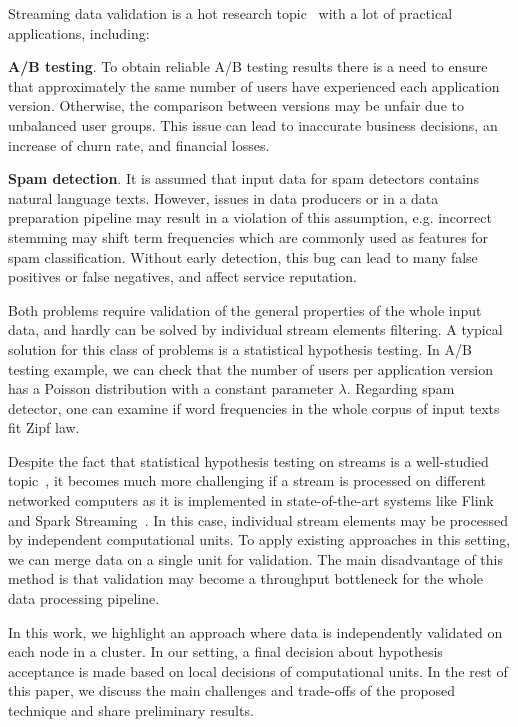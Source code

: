 \label {fs-short-intro}

Streaming data validation is a hot research topic~\cite{Xu:2013:MVS:2488222.2488275, frank2018semantic} with a lot of practical applications, including:

{\bf A/B testing}. To obtain reliable A/B testing results there is a need to ensure that approximately the same number of users have experienced each application version. Otherwise, the comparison between versions may be unfair due to unbalanced user groups. This issue can lead to inaccurate business decisions, an increase of churn rate, and financial losses.
    
{\bf Spam detection}. It is assumed that input data for spam detectors contains natural language texts. However, issues in data producers or in a data preparation pipeline may result in a violation of this assumption, e.g. incorrect stemming may shift term frequencies which are commonly used as features for spam classification. Without early detection, this bug can lead to many false positives or false negatives, and affect service reputation.

Both problems require validation of the general properties of the whole input data, and hardly can be solved by individual stream elements filtering. A typical solution for this class of problems is a statistical hypothesis testing. In A/B testing example, we can check that the number of users per application version has a Poisson distribution with a constant parameter $\lambda$. Regarding spam detector, one can examine if word frequencies in the whole corpus of input texts fit Zipf law. 

Despite the fact that statistical hypothesis testing on streams is a well-studied topic~\cite{kifer2004detecting, lall2015data}, it becomes much more challenging if a stream is processed on different networked computers as it is implemented in state-of-the-art systems like Flink~\cite{Carbone:2017:SMA:3137765.3137777} and Spark Streaming~\cite{Zaharia:2012:DSE:2342763.2342773}. In this case, individual stream elements may be processed by independent computational units. To apply existing approaches in this setting, we can merge data on a single unit for validation. The main disadvantage of this method is that validation may become a throughput bottleneck for the whole data processing pipeline. 

In this work, we highlight an approach where data is independently validated on each node in a cluster. In our setting, a final decision about hypothesis acceptance is made based on local decisions of computational units. In the rest of this paper, we discuss the main challenges and trade-offs of the proposed technique and share preliminary results.